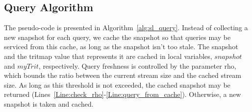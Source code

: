 \subsection{Query Algorithm} \label{ssec:query_alg} %

The pseudo-code is presented in Algorithm~\ref{alg:sl_query}. Instead of collecting a new snapshot for each query, we cache the snapshot so that queries may be serviced from this cache, as long as the snapshot isn't too stale. The snapshot and the tritmap value that represents it are cached in local variables, $\mathit{snapshot}$ and $\mathit{myTrit}$, respectively. Query freshness is controlled by the parameter \gls{rho}, which bounds the ratio between the current stream size and the cached stream size. As long as this threshold is not exceeded, the cached snapshot may be returned (Lines~\ref{Line:check_rho}-\ref{Line:query_from_cache}). Otherwise, a new snapshot is taken and cached. 


